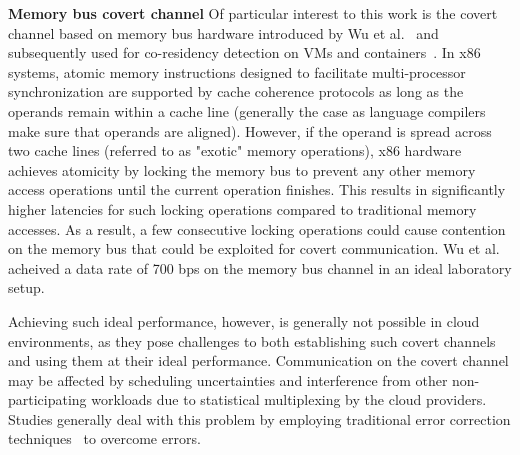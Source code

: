\noindent \textbf{Memory bus covert channel} 
Of particular interest to this work is the covert channel based on memory bus
hardware introduced by Wu et al.~\cite{wuusenix2012} and subsequently used for
co-residency detection on VMs and
containers~\cite{compstudycoresidency,varad191016}. In x86 systems, atomic
memory instructions designed to facilitate multi-processor synchronization are
supported by cache coherence protocols as long as the operands remain within a
cache line (generally the case as language compilers make sure that operands are
aligned). However, if the operand is spread across two cache lines (referred to
as "exotic" memory operations), x86 hardware achieves atomicity by locking the
memory bus to prevent any other memory access operations until the current
operation finishes. This results in significantly higher latencies for such
locking operations compared to traditional memory accesses. As a result, a few
consecutive locking operations could cause contention on the memory bus that
could be exploited for covert communication.  Wu et al. acheived a data rate of
700 bps on the memory bus channel in an ideal laboratory setup.


Achieving such ideal performance, however, is generally not possible in cloud
environments, as they pose challenges to both establishing such covert channels
and using them at their ideal performance. 
Communication on the covert channel may be affected by scheduling uncertainties
and interference from other non-participating workloads due to statistical
multiplexing by the cloud providers.  Studies generally deal with this problem
by employing traditional error correction techniques~\cite{wuusenix2012} to
overcome errors.  



